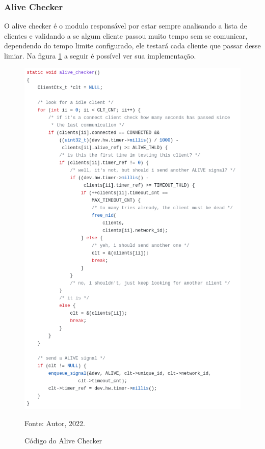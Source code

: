 \subsubsection{Alive Checker}

O alive checker é o modulo responsável por estar sempre analisando a lista de clientes e
validando a se algum cliente passou muito tempo sem se comunicar, dependendo do tempo limite
configurado, ele testará cada cliente que passar desse limiar. Na figura \ref{fig:code-alive-checker} a seguir é possível ver sua implementação.

\begin{figure}[H]
    \centering
	\caption{Código do Alive Checker}
    \includegraphics[height=0.7\textheight,keepaspectratio]{img/alive-checker.png}
    \label{fig:code-alive-checker}
    
    Fonte: Autor, 2022.
\end{figure}

